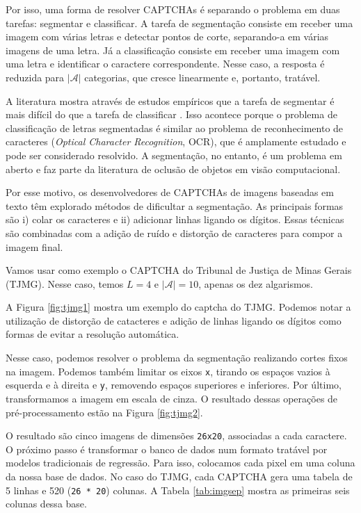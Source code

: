 \documentclass[12pt,]{report}
\begin{document}
Por isso, uma forma de resolver CAPTCHAs é separando o problema em duas tarefas: segmentar e classificar. A tarefa de segmentação consiste em receber uma imagem com várias letras e detectar pontos de corte, separando-a em várias imagens de uma letra. Já a classificação consiste em receber uma imagem com uma letra e identificar o caractere correspondente. Nesse caso, a resposta é reduzida para \(|\mathcal A|\) categorias, que cresce linearmente e, portanto, tratável.

A literatura mostra através de estudos empíricos que a tarefa de segmentar é mais difícil do que a tarefa de classificar \citep{bursztein2014end}. Isso acontece porque o problema de classificação de letras segmentadas é similar ao problema de reconhecimento de caracteres (\emph{Optical Character Recognition}, OCR), que é amplamente estudado e pode ser considerado resolvido. A segmentação, no entanto, é um problema em aberto e faz parte da literatura de oclusão de objetos em visão computacional.

Por esse motivo, os desenvolvedores de CAPTCHAs de imagens baseadas em texto têm explorado métodos de dificultar a segmentação. As principais formas são i) colar os caracteres e ii) adicionar linhas ligando os dígitos. Essas técnicas são combinadas com a adição de ruído e distorção de caracteres para compor a imagem final.

Vamos usar como exemplo o CAPTCHA do Tribunal de Justiça de Minas Gerais (TJMG). Nesse caso, temos \(L=4\) e \(|\mathcal A|=10\), apenas os dez algarismos.

A Figura \ref{fig:tjmg1} mostra um exemplo do captcha do TJMG. Podemos notar a utilização de distorção de catacteres e adição de linhas ligando os dígitos como formas de evitar a resolução automática.

Nesse caso, podemos resolver o problema da segmentação realizando cortes fixos na imagem. Podemos também limitar os eixos \texttt{x}, tirando os espaços vazios à esquerda e à direita e \texttt{y}, removendo espaços superiores e inferiores. Por último, transformamos a imagem em escala de cinza. O resultado dessas operações de pré-processamento estão na Figura \ref{fig:tjmg2}.

O resultado são cinco imagens de dimensões \texttt{26x20}, associadas a cada caractere. O próximo passo é transformar o banco de dados num formato tratável por modelos tradicionais de regressão. Para isso, colocamos cada pixel em uma coluna da nossa base de dados. No caso do TJMG, cada CAPTCHA gera uma tabela de 5 linhas e 520 (\texttt{26\ *\ 20}) colunas. A Tabela \ref{tab:imgsep} mostra as primeiras seis colunas dessa base.
\end{document}
